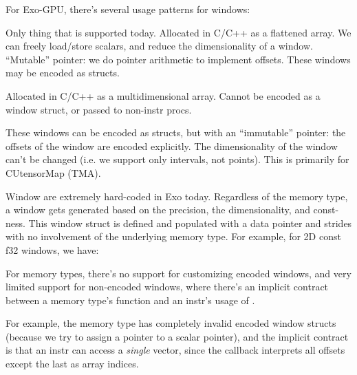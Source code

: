 \filbreak
{}

For Exo-GPU, there's several usage patterns for windows:

\filbreak
{} Only thing that is supported today.
Allocated in C/C++ as a flattened array.
We can freely load/store scalars, and reduce the dimensionality of a window.
``Mutable'' pointer: we do pointer arithmetic to implement offsets.
These windows may be encoded as structs.



\filbreak
{} Allocated in C/C++ as a multidimensional array.
Cannot be encoded as a window struct, or passed to non-instr procs.



\filbreak
{}
These windows can be encoded as structs, but with an ``immutable'' pointer: the offsets of the window are encoded explicitly.
The dimensionality of the window can't be changed (i.e. we support only intervals, not points).
This is primarily for CUtensorMap (TMA).



\filbreak
{}

Window are extremely hard-coded in Exo today.
Regardless of the memory type, a window gets generated based on the precision, the dimensionality, and const-ness.
This window struct is defined and populated with a data pointer and strides with no involvement of the underlying memory type. For example, for 2D const f32 windows, we have:



\filbreak
For memory types, there's no support for customizing encoded windows, and very limited support for non-encoded windows, where there's an implicit contract between a memory type's  function and an instr's usage of  .

\filbreak
For example, the  memory type has completely invalid encoded window structs (because we try to assign a  pointer to a scalar  pointer), and the implicit  contract is that an instr can access a \textit{single}  vector, since the  callback interprets all offsets except the last as array indices.



